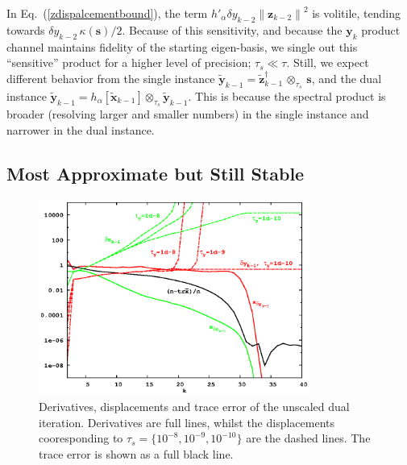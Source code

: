 \documentclass[letterpaper,twocolumn,amsmath,amsfont,amssymb,english,aps,jcp,preprintnumbers,groupaddress,nofootinbib,tightenlines,floatfix]{revtex4}
\newcommand{\mat}[1]{\boldsymbol{#1}}
\newcommand{\ots}{ {\scriptstyle \otimes}_{ \! \tau_s } }
\theoremstyle{plain}
\theoremstyle{remark}
\theoremstyle{plain}
\begin{document}
In Eq.~(\ref{zdispalcementbound}),  the term $h'_\alpha  \delta y_{k-2} { \lVert \mat{z}_{k-2} \rVert }^2$ is volitile, tending towards
$\delta y_{k-2} \, \kappa(\mat{s})/2$.  Because of this sensitivity, and because the $\mat{y}_k$ product channel maintains fidelity 
of the starting eigen-basis, we single out this ``sensitive'' product for a higher level of precision; $\tau_s \ll \tau$.
Still, we expect different behavior from the single instance $\widetilde{\mat{y}}_{k-1} = \widetilde{\mat{z}}^{\dagger}_{k-1} \, \ots \, \mat{s}$,
and the dual instance $\widetilde{\mat{y}}_{k-1} =  h_\alpha [\widetilde{\mat{x}}_{k-1}]  \ots \widetilde{\mat{y}}_{k-1} $.
This is because the spectral product is broader (resolving larger and smaller numbers) 
in the single instance and narrower in the dual instance.

\subsection{Most Approximate but Still Stable}

\begin{figure}[h]
\includegraphics[width=3.5in]{fig_33_tube_cond_10_noscaling/33_nanotube_cond10_noscale_dual.eps}
\caption{Derivatives, displacements and trace error of the unscaled dual iteration.
Derivatives are full lines, whilst the displacements cooresponding to $\tau_s=\{10^{-8}, 10^{-9}, 10^{-10}\}$
are the dashed lines.  The trace error is shown as a full black line. } \label{flow_noscale_dual}
\end{figure}
\end{document}
